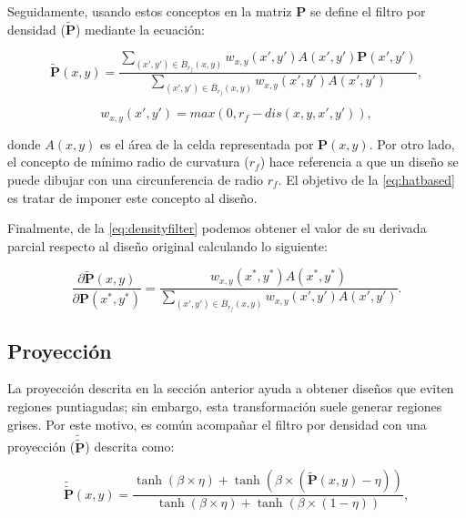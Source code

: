 Seguidamente, usando estos conceptos en la matriz $\boldsymbol{P}$
se define el filtro por densidad ($\widetilde{\boldsymbol{P}}$) mediante la ecuación:

\begin{equation}
  \widetilde{\boldsymbol{P}}(x, y) = \frac{\displaystyle\sum_{(x', y') \in \overline{B}_{r_f}(x, y)} w_{x, y}(x', y')
  A(x', y')\boldsymbol{P}(x', y')}
  {\displaystyle\sum_{(x', y') \in \overline{B}_{r_f}(x, y)} w_{x, y}(x', y') A(x', y')},
  \label{eq:densityfilter}
\end{equation}

\begin{equation}
  w_{x, y}(x', y') = max(0, r_f - dis(x, y, x', y')),
  \label{eq:hatbased}
\end{equation}

\noindent donde $A(x, y)$ es el área de la celda representada por $\boldsymbol{P}(x, y)$. 
Por otro lado, el concepto de mínimo radio de curvatura ($r_f$) hace referencia a que un diseño
se puede dibujar con una circunferencia de radio $r_f$.
El objetivo de la \autoref{eq:hatbased} es tratar de imponer este concepto al diseño.

Finalmente, de la \autoref{eq:densityfilter} podemos obtener el valor de su derivada parcial respecto al diseño
original calculando lo siguiente:

\begin{equation}
  \frac{\partial\widetilde{\boldsymbol{P}}(x, y)}{\partial \boldsymbol{P}(x^{*}, y^{*})} = \frac{w_{x, y}(x^{*},
  y^{*})A(x^{*}, y^{*})}
  {\displaystyle\sum_{(x', y') \in \overline{B}_{r_f}(x, y)} w_{x, y}(x', y') A(x', y')}.
  \label{eq:densityfiltergrad}
\end{equation}

\subsection{Proyección}

La proyección descrita en la sección anterior ayuda a obtener diseños que eviten regiones puntiagudas;
sin embargo, esta transformación suele generar regiones grises.
Por este motivo, es común acompañar el filtro por densidad con una proyección 
($\widetilde{\widetilde{\boldsymbol{P}}}$) descrita como:

\begin{equation}
  \widetilde{\widetilde{\boldsymbol{P}}}(x, y) = \frac{\tanh (\beta \times \eta) + \tanh (\beta \times
  (\widetilde{\boldsymbol{P}}(x, y)
  - \eta))}{\tanh (\beta \times \eta) + \tanh (\beta \times (1 - \eta))},
  \label{eq:projection}
\end{equation}

